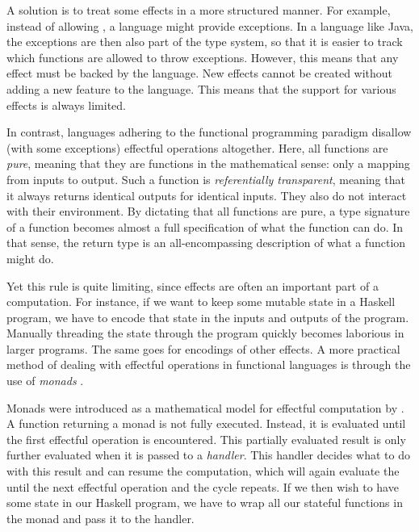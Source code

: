A solution is to treat some effects in a more structured manner. For example, instead of allowing , a language might provide exceptions. In a language like Java, the exceptions are then also part of the type system, so that it is easier to track which functions are allowed to throw exceptions. However, this means that any effect must be backed by the language. New effects cannot be created without adding a new feature to the language. This means that the support for various effects is always limited.

In contrast, languages adhering to the functional programming paradigm disallow (with some exceptions) effectful operations altogether. Here, all functions are \emph{pure}, meaning that they are functions in the mathematical sense: only a mapping from inputs to output. Such a function is \emph{referentially transparent}, meaning that it always returns identical outputs for identical inputs. They also do not interact with their environment. By dictating that all functions are pure, a type signature of a function becomes almost a full specification of what the function can do. In that sense, the return type is an all-encompassing description of what a function might do.



Yet this rule is quite limiting, since effects are often an important part of a computation. For instance, if we want to keep some mutable state  in a Haskell program, we have to encode that state in the inputs and outputs of the program. Manually threading the state through the program quickly becomes laborious in larger programs. The same goes for encodings of other effects. A more practical method of dealing with effectful operations in functional languages is through the use of \emph{monads} \autocite{wadler_essence_1992,peyton_jones_imperative_1993}.

Monads were introduced as a mathematical model for effectful computation by \textcite{moggi_notions_1991}. A function returning a monad is not fully executed. Instead, it is evaluated until the first effectful operation is encountered. This partially evaluated result is only further evaluated when it is passed to a \emph{handler}. This handler decides what to do with this result and can resume the computation, which will again evaluate the until the next effectful operation and the cycle repeats. If we then wish to have some state in our Haskell program, we have to wrap all our stateful functions in the  monad and pass it to the  handler.

